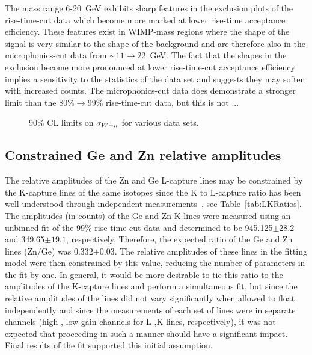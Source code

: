 The mass range 6-20~GeV exhibits sharp features in the exclusion plots of the rise-time-cut data which become more marked at lower rise-time acceptance efficiency.  These features exist in WIMP-mass regions where the shape of the signal is very similar to the shape of the background and are therefore also in the microphonics-cut data from $\sim11\to22$~GeV.  The fact that the shapes in the exclusion become more pronounced at lower rise-time-cut acceptance efficiency implies a sensitivity to the statistics of the data set and suggests they may soften with increased counts.  The microphonics-cut data does demonstrate a stronger limit than the 80\%$\to$99\% rise-time-cut data, but this is not ...

		\begin{sidewaysfigure}
			\centering
			\caption{90\% CL limits on $\sigma_{W-n}$ for various data sets.}
			\label{fig:UnconstrainedLimits}
		\end{sidewaysfigure}		
	\subsection{Constrained Ge and Zn relative amplitudes}
	\label{sec:LimitsConstrained}
	
The relative amplitudes of the Zn and Ge L-capture lines may be constrained by the K-capture lines of the same isotopes since the K to L-capture ratio has been well understood through independent measurements~\cite{Bea67,Ocampo1962}, see Table~\ref{tab:LKRatios}.  The amplitudes (in counts) of the Ge and Zn K-lines were measured using an unbinned fit of the 99\% rise-time-cut data and determined to be 945.125$\pm28.2$ and 349.65$\pm19.1$, respectively.  Therefore, the expected ratio of the Ge and Zn lines (Zn/Ge) was 0.332$\pm$0.03.  The relative amplitudes of these lines in the fitting model were then constrained by this value, reducing the number of parameters in the fit by one.  In general, it would be more desirable to tie this ratio to the amplitudes of the K-capture lines and perform a simultaneous fit, but since the relative amplitudes of the lines did not vary significantly when allowed to float independently and since the measurements of each set of lines were in separate channels (high-, low-gain channels for L-,K-lines, respectively), it was not expected that proceeding in such a manner should have a significant impact.  Final results of the fit supported this initial assumption.
	
